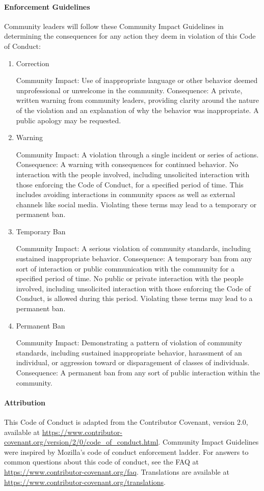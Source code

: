 \paragraph{Enforcement Guidelines}
Community leaders will follow these Community Impact Guidelines in determining
the consequences for any action they deem in violation of this Code of Conduct:
\begin{enumerate}
\item Correction

Community Impact: Use of inappropriate language or other behavior deemed
unprofessional or unwelcome in the community.
Consequence: A private, written warning from community leaders, providing
clarity around the nature of the violation and an explanation of why the
behavior was inappropriate. A public apology may be requested.
\item Warning

Community Impact: A violation through a single incident or series
of actions.
Consequence: A warning with consequences for continued behavior. No
interaction with the people involved, including unsolicited interaction with
those enforcing the Code of Conduct, for a specified period of time. This
includes avoiding interactions in community spaces as well as external channels
like social media. Violating these terms may lead to a temporary or
permanent ban.
\item Temporary Ban

Community Impact: A serious violation of community standards, including
sustained inappropriate behavior.
Consequence: A temporary ban from any sort of interaction or public
communication with the community for a specified period of time. No public or
private interaction with the people involved, including unsolicited interaction
with those enforcing the Code of Conduct, is allowed during this period.
Violating these terms may lead to a permanent ban.
\item Permanent Ban

Community Impact: Demonstrating a pattern of violation of community
standards, including sustained inappropriate behavior,  harassment of an
individual, or aggression toward or disparagement of classes of individuals.
Consequence: A permanent ban from any sort of public interaction within
the community.
\end{enumerate}

\paragraph{Attribution}
This Code of Conduct is adapted from the Contributor Covenant,
version 2.0, available at
\href{https://www.contributor-covenant.org/version/2/0/code_of_conduct.html}{https://www.contributor-covenant.org/version/2/0/code\_of\_conduct.html}.
Community Impact Guidelines were inspired by
Mozilla’s code of conduct enforcement ladder.
For answers to common questions about this code of conduct, see the FAQ at
\href{https://www.contributor-covenant.org/faq}{https://www.contributor-covenant.org/faq}. Translations are available
at \href{https://www.contributor-covenant.org/translations}{https://www.contributor-covenant.org/translations}.

